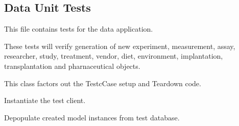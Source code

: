 \documentclass[letterpaper,10pt,english]{sphinxmanual}
\begin{document}
\subsection{Data Unit Tests}
\label{data:data-unit-tests}\label{data:module-mousedb.data.tests}
This file contains tests for the data application.

These tests will verify generation of new experiment, measurement, assay, researcher, study, treatment, vendor, diet, environment, implantation, transplantation and pharnaceutical objects.

\begin{fulllineitems}
\label{data:mousedb.data.tests.BasicTestCase}
This class factors out the TestcCase setup and Teardown code.

\begin{fulllineitems}
\label{data:mousedb.data.tests.BasicTestCase.setUp}
Instantiate the test client.

\end{fulllineitems}


\begin{fulllineitems}
\label{data:mousedb.data.tests.BasicTestCase.tearDown}
Depopulate created model instances from test database.

\end{fulllineitems}


\end{fulllineitems}

\end{document}
